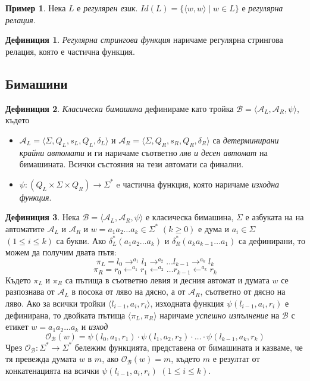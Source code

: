 \documentclass[12pt, oneside]{article}
\theoremstyle{definition}
\newtheorem{definition}{Дефиниция}[section]
\newtheorem{example}{Пример}[section]
\begin{document}
\begin{example}
	Нека \(L\) е \emph{регулярен език}. \( Id(L) = \{ \langle w, w \rangle \mid w \in L \}\) е \emph{регулярна релация}.
\end{example}

\begin{definition}
	\emph{Регулярна стрингова функция} наричаме регулярна стрингова релация, която е частична функция. 
\end{definition}

\subsection{Бимашини}

\begin{definition}
	 \emph{Класическа бимашина} дефинираме като тройка \( \mathcal{B} = \langle \mathcal{A}_L, \mathcal{A}_R, \psi \rangle \), където

	\begin{itemize}
		\item \( \mathcal{A}_L = \langle \Sigma, Q_L, s_L, Q_L, \delta_L \rangle \) и \( \mathcal{A}_R = \langle \Sigma, Q_R, s_R, Q_R, \delta_R \rangle \) са \emph{детерминирани крайни автомати} и ги наричаме съответно \emph{ляв и десен автомат} на бимашината. Всички състояния на тези автомати са финални.
		\item \( \psi:(Q_L \times \Sigma \times Q_R) \to \Sigma^* \) e частична функция, която наричаме \emph{изходна функция}.
	\end{itemize}
\end{definition}

\begin{definition}
	Нека \( \mathcal{B} = \langle \mathcal{A}_L, \mathcal{A}_R, \psi \rangle \) е класическа бимашина, \( \Sigma \) е азбуката на на автоматите \( \mathcal{A}_L \) и \( \mathcal{A}_R \) и \( w = a_1a_2 \dots a_k \in \Sigma^* \) \( (k \geq 0) \) е дума и \( a_i \in \Sigma \) \( (1 \leq i \leq k) \) са букви. Ако \( \delta_L^*(a_1a_2 \ldots a_k) \) и \( \delta_R^*(a_ka_{k-1} \dots a_1) \) са дефинирани, то можем да получим двата пътя:
	\[ \pi_L = l_0 \to^{a_1} l_1 \to^{a_2} \ldots l_{k-1} \to^{a_k} l_k \]
	\[ \pi_R = r_0 \leftarrow^{a_1} r_1 \leftarrow^{a_2} \ldots r_{k-1} \leftarrow^{a_k} r_k \]
	Където \( \pi_L \) и \( \pi_R \) са пътища в съответно левия и десния автомат и думата \( w \) се разпознава от \( \mathcal{A}_L \) в посока от ляво на дясно, а от \( \mathcal{A}_R \), съответно от дясно на ляво. Ако за всички тройки \( \langle l_{i-1}, a_i, r_i \rangle \), изходната функция \( \psi(l_{i-1}, a_i, r_i) \) е дефинирана, то двойката пътища \( \langle \pi_L, \pi_R \rangle \) наричаме \emph{успешно изпълнение} на \( \mathcal{B} \) с етикет \( w = a_1a_2 \dots a_k \) и \emph{изход}
	\[ \mathcal{O_B}(w) = \psi(l_0, a_1, r_1) \cdot \psi(l_1, a_2, r_2) \cdot \dots \cdot \psi(l_{k-1}, a_k, r_k) \]
	Чрез \( \mathcal{O_B}: \Sigma^* \to \Sigma^* \) бележим функцията, представена от бимашината и казваме, че тя превежда думата \(w\) в \(m\), ако \( \mathcal{O_B}(w) = m \), където \(m\) е резултат от конкатенацията на всички \( \psi(l_{i-1}, a_i, r_i) \) \( (1 \leq i \leq k) \).
\end{definition}
\end{document}
